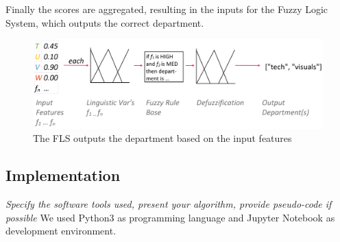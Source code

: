 \documentclass[journal]{IEEEtran}
\begin{document}
\begin{enumerate}
    Finally the scores are aggregated, resulting in the inputs for the Fuzzy Logic System, which outputs the correct department.

    \begin{figure}[ht!]
        \centering
        \includegraphics[width=.9\linewidth]{res/classifying}
        \caption{The FLS outputs the department based on the input features}
        \label{fig:sub1}
    \end{figure}

\end{enumerate}


\subsection{Implementation}
\textit{Specify the software tools used, present your algorithm,
provide pseudo-code if possible}
We used Python3 as programming language and Jupyter Notebook as development environment. 

\end{document}
